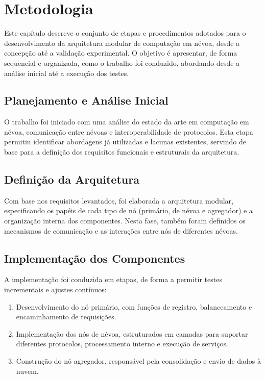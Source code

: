 \chapter{Metodologia}\label{cap:metodologia}

Este capítulo descreve o conjunto de etapas e procedimentos adotados para o desenvolvimento da arquitetura modular de computação em névoa, desde a concepção até a validação experimental. O objetivo é apresentar, de forma sequencial e organizada, como o trabalho foi conduzido, abordando desde a análise inicial até a execução dos testes.

\section{Planejamento e Análise Inicial}

O trabalho foi iniciado com uma análise do estado da arte em computação em névoa, comunicação entre névoas e interoperabilidade de protocolos. Esta etapa permitiu identificar abordagens já utilizadas e lacunas existentes, servindo de base para a definição dos requisitos funcionais e estruturais da arquitetura.

\section{Definição da Arquitetura}

Com base nos requisitos levantados, foi elaborada a arquitetura modular, especificando os papéis de cada tipo de nó (primário, de névoa e agregador) e a organização interna dos componentes. Nesta fase, também foram definidos os mecanismos de comunicação e as interações entre nós de diferentes névoas.

\section{Implementação dos Componentes}

A implementação foi conduzida em etapas, de forma a permitir testes incrementais e ajustes contínuos:
\begin{enumerate}
    \item Desenvolvimento do nó primário, com funções de registro, balanceamento e encaminhamento de requisições.
    \item Implementação dos nós de névoa, estruturados em camadas para suportar diferentes protocolos, processamento interno e execução de serviços.
    \item Construção do nó agregador, responsável pela consolidação e envio de dados à nuvem.
\end{enumerate}


